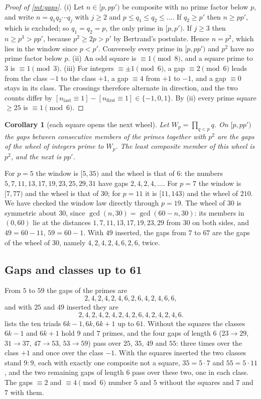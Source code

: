 \documentclass[11pt]{article}
\newtheorem{corollary}[theorem]{Corollary}
\theoremstyle{definition}\newtheorem{definition}[theorem]{Definition}
\theoremstyle{remark}\newtheorem{remark}[theorem]{Remark}
\theoremstyle{definition}\newtheorem{axiom}{Axiom}
\begin{document}
\begin{proof}[Proof of \cref{mt:gaps}]
(i) Let $n\in[p,pp')$ be composite with no prime factor below $p$, and write $n=q_1q_2\cdots q_j$ with $j\ge2$ and $p\le q_1\le q_2\le\dots$. If $q_2\ge p'$ then $n\ge pp'$, which is excluded; so $q_1=q_2=p$, the only prime in $[p,p')$. If $j\ge3$ then $n\ge p^3>pp'$, because $p^2\ge2p>p'$ by Bertrand's postulate. Hence $n=p^2$, which lies in the window since $p<p'$. Conversely every prime in $[p,pp')$ and $p^2$ have no prime factor below $p$.
(ii) An odd square is $\equiv1\pmod8$, and a square prime to $3$ is $\equiv1\pmod3$.
(iii) For integers $\equiv\pm1\pmod6$, a gap $\equiv2\pmod6$ leads from the class $-1$ to the class $+1$, a gap $\equiv4$ from $+1$ to $-1$, and a gap $\equiv0$ stays in its class. The crossings therefore alternate in direction, and the two counts differ by $[n_{\mathrm{last}}\equiv1]-[n_{\mathrm{first}}\equiv1]\in\{-1,0,1\}$. By (ii) every prime square $\ge25$ is $\equiv1\pmod6$.
\end{proof}

\begin{corollary}[each square opens the next wheel]\label{cor:wheel}
Let $W_p=\prod_{q<p}q$. On $[p,pp')$ the gaps between consecutive members of the primes together with $p^2$ are the gaps of the wheel of integers prime to $W_p$. The least composite member of this wheel is $p^2$, and the next is $pp'$.
\end{corollary}

For $p=5$ the window is $[5,35)$ and the wheel is that of $6$: the numbers $5,7,11,13,17,19,23,25,29,31$ have gaps $2,4,2,4,\dots$. For $p=7$ the window is $[7,77)$ and the wheel is that of $30$; for $p=11$ it is $[11,143)$ and the wheel of $210$. We have checked the window law directly through $p=19$. The wheel of $30$ is symmetric about $30$, since $\gcd(n,30)=\gcd(60-n,30)$: its members in $(0,60)$ lie at the distances $1,7,11,13,17,19,23,29$ from $30$ on both sides, and $49=60-11$, $59=60-1$. With $49$ inserted, the gaps from $7$ to $67$ are the gaps of the wheel of $30$, namely $4,2,4,2,4,6,2,6$, twice.

\subsection{Gaps and classes up to 61}

From $5$ to $59$ the gaps of the primes are
\[
2,4,2,4,2,4,6,2,6,4,2,4,6,6,
\]
and with $25$ and $49$ inserted they are
\[
2,4,2,4,2,4,2,4,2,6,4,2,4,2,4,6 .
\]
 lists the ten triads $6k-1,6k,6k+1$ up to $61$. Without the squares the classes $6k-1$ and $6k+1$ hold $9$ and $7$ primes, and the four gaps of length $6$ ($23\to29$, $31\to37$, $47\to53$, $53\to59$) pass over $25$, $35$, $49$ and $55$: three times over the class $+1$ and once over the class $-1$. With the squares inserted the two classes stand $9:9$, each with exactly one composite not a square, $35=5\cdot7$ and $55=5\cdot11$, and the two remaining gaps of length $6$ pass over these two, one in each class. The gaps $\equiv2$ and $\equiv4\pmod6$ number $5$ and $5$ without the squares and $7$ and $7$ with them.
\end{document}
